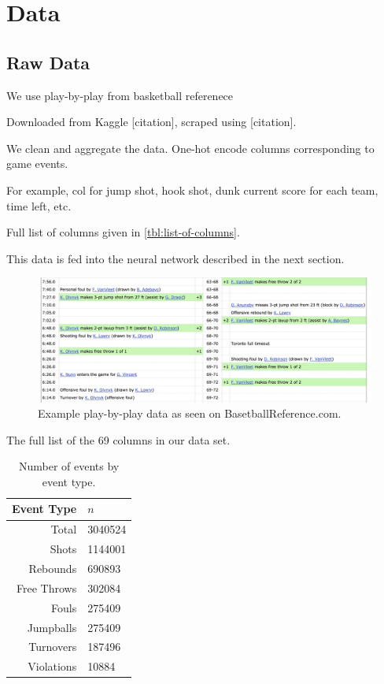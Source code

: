 \section{Data}

\subsection{Raw Data}

We use play-by-play from basketball referenece

Downloaded from Kaggle [citation], scraped using [citation].

We clean and aggregate the data. One-hot encode columns corresponding to game events.

For example, col for jump shot, hook shot, dunk current score for each team, time left, etc.

Full list of columns given in \autoref{tbl:list-of-columns}.

This data is fed into the neural network described in the next section.

\begin{figure}
	\includegraphics[width = .8 \textwidth]{figures/bbref-pbp.jpg}
	\caption{Example play-by-play data as seen on BasetballReference.com.}
\end{figure}

\begin{table}
	\caption{The full list of the 69 columns in our data set.}
	\label{tbl:list-of-columns}
\end{table}

\begin{table}
	\centering
	\begin{tabular}{rl}
		\hline
		Event Type  & $n$     \\
		\hline
		Total       & 3040524 \\
		Shots       & 1144001 \\
		Rebounds    & 690893  \\
		Free Throws & 302084  \\
		Fouls       & 275409  \\
		Jumpballs   & 275409  \\
		Turnovers   & 187496  \\
		Violations  & 10884   \\
		\hline
	\end{tabular}
	\caption{Number of events by event type.}
\end{table}


